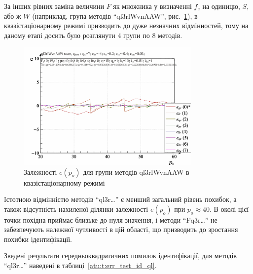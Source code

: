 За інших рівних заміна величини
$F$ як множника у визначенні
$f_e$ на одиницю,
$S$, або ж
$W$ (наприклад, група методів ``ql3rlWvnAAW'', рис.~\ref{atu:f:ql3rlWvnAAW_scan}),
в квазістаціонарному режимі призводить до дуже незначних
відмінностей, тому на даному етапі досить було розглянути 4
групи по 8 методів.

\begin{figure}[htb!]
  \begin{center}
    \includegraphics[width=0.8\textwidth]{p/scan/qls-p_p_e_ql3rlWvnAAW_scan.png}
  \end{center}
  \caption{Залежності $e(p_o)$ для групи методів ql3rlWvnAAW в квазістаціонарному режимі}
  \label{atu:f:ql3rlWvnAAW_scan}
\end{figure}

Істотною відмінністю методів ``ql3r\ldots'' є менший загальний рівень
похибок, а також відсутність нахиленої ділянки залежності $e(p_o)$ при
$p_o \approx 40$. В околі цієї точки похідна приймає близьке до нуля значення, і
методи ``Fq3r\ldots'' не забезпечують належної чутливості в цій області, що
призводить до зростання похибки ідентифікації.


Зведені результати середньоквадратичних помилок ідентифікації,
для методів ``ql3r\ldots'' наведені в таблиці~\ref{atu:t:err_test_id_ql}.

